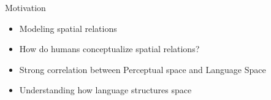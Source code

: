 

\begin{frame}{Motivation}
	\begin{itemize}
		\item Modeling spatial relations
		
		\item How do humans conceptualize spatial relations?
		
		\item Strong correlation between Perceptual space and Language Space
		
		\item Understanding how language structures space

	\end{itemize}
\end{frame}

